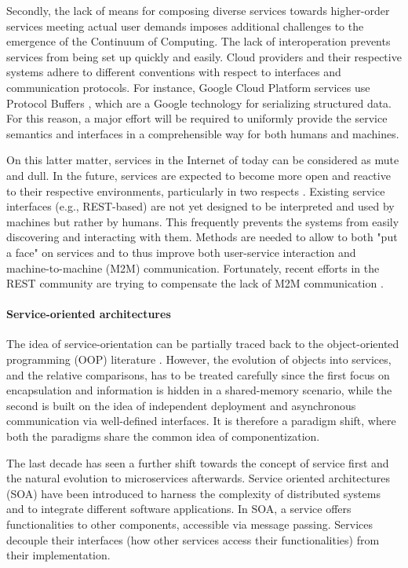 \documentclass{ieeeaccess}
\begin{document}
Secondly, the lack of means for composing diverse services towards higher-order services meeting actual user demands imposes additional challenges to the emergence of the Continuum of Computing. The lack of interoperation prevents services from being set up quickly and easily. Cloud providers and their respective systems adhere to different conventions with respect to interfaces and communication protocols. For instance, Google Cloud Platform services use Protocol Buffers \cite{protobuf}, which are a Google technology for serializing structured data. For this reason, a major effort will be required to uniformly provide the service semantics and interfaces in a comprehensible way for both humans and machines.

On this latter matter, services in the Internet of today can be considered as mute and dull. In the future, services are expected to become more open and reactive to their respective environments, particularly in two respects \cite{iot-enterprise}. Existing service interfaces (e.g., REST-based) are not yet designed to be interpreted and used by machines but rather by humans. This frequently prevents the systems from easily discovering and interacting with them. Methods are needed to allow to both "put a face" on services and to thus improve both user-service interaction and machine-to-machine (M2M) communication. Fortunately, recent efforts in the REST community are trying to compensate the lack of M2M communication \cite{openapi}.

\paragraph{Service-oriented architectures}

The idea of service-orientation can be partially traced back to the object-oriented programming (OOP) literature \cite{microservices-today}. However, the evolution of objects into services, and the relative comparisons, has to be treated carefully since the first focus on encapsulation and information is hidden in a shared-memory scenario, while the second is built on the idea of independent deployment and asynchronous communication via well-defined interfaces. It is therefore a paradigm shift, where both the paradigms share the common idea of componentization.

The last decade has seen a further shift towards the concept of service first and the natural evolution to microservices afterwards. Service oriented architectures (SOA) have been introduced to harness the complexity of distributed systems and to integrate different software applications. In SOA, a service offers functionalities to other components, accessible via message passing. Services decouple their interfaces (how other services access their functionalities) from their implementation.
\end{document}
